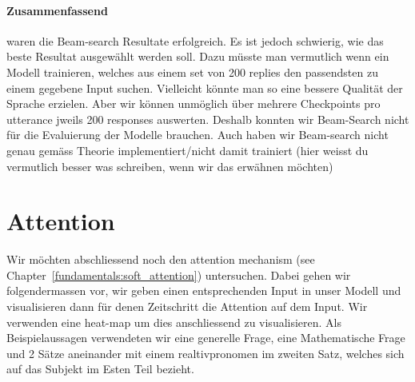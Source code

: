 \paragraph{Zusammenfassend} waren die Beam-search Resultate erfolgreich. Es ist jedoch schwierig, wie das beste Resultat ausgewählt werden soll. Dazu müsste man vermutlich wenn ein Modell trainieren, welches aus einem set von 200 replies den passendsten zu einem gegebene Input suchen. Vielleicht könnte man so eine bessere Qualität der Sprache erzielen. Aber wir können unmöglich über mehrere Checkpoints pro utterance jweils 200 responses auswerten. Deshalb konnten wir Beam-Search nicht für die Evaluierung der Modelle brauchen. Auch haben wir Beam-search nicht genau gemäss Theorie implementiert/nicht damit trainiert (hier weisst du vermutlich besser was schreiben, wenn wir das erwähnen möchten)
\section{Attention}
Wir möchten abschliessend noch den attention mechanism (see Chapter~\ref{fundamentals:soft_attention}) untersuchen. Dabei gehen wir folgendermassen vor, wir geben einen entsprechenden Input in unser Modell und visualisieren dann für denen Zeitschritt die Attention auf dem Input. Wir verwenden eine heat-map um dies anschliessend zu visualisieren. Als Beispielaussagen verwendeten wir eine generelle Frage, eine Mathematische Frage und 2 Sätze aneinander mit einem realtivpronomen im zweiten Satz, welches sich auf das Subjekt im Esten Teil bezieht.

